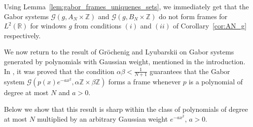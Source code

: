 \documentclass[12pt]{amsart}
\numberwithin{equation}{section}
\newcommand{\R}{{\mathbb R}} \newcommand{\Q}{{\mathbb Q}} \newcommand{\Z}{{\mathbb Z}} \newcommand{\N}{{\mathbb N}}
\begin{document}
Using Lemma~\ref{lem:gabor_frames_uniquenes_sets}, we immediately get that the Gabor systems $\mathcal{G}(g, A_N\times\Z)$ and $\mathcal{G}(g, B_N\times\Z)$ do not form  frames for $L^2(\R)$ for windows $g$ from conditions $(i)$ and $(ii)$ of Corollary~\ref{cor:AN_g} respectively.

We now return to the result of Gr\"{o}chenig and Lyubarskii on Gabor systems generated by polynomials with Gaussian weight, mentioned in the introduction. In \cite{MR2529475}, it was proved that the condition
$
\alpha\beta<\frac{1}{N+1}
$
guarantees that the Gabor system
$
\mathcal{G}(p(x)e^{-a x^2},\alpha\Z\times\beta\Z)
$
forms a frame whenever $p$ is a polynomial of degree at most $N$ and $a>0$.

Below we show that this result is sharp within the class of polynomials of degree at most $N$ multiplied by an arbitrary Gaussian weight $e^{-a x^2}$, $a>0$.
\end{document}
